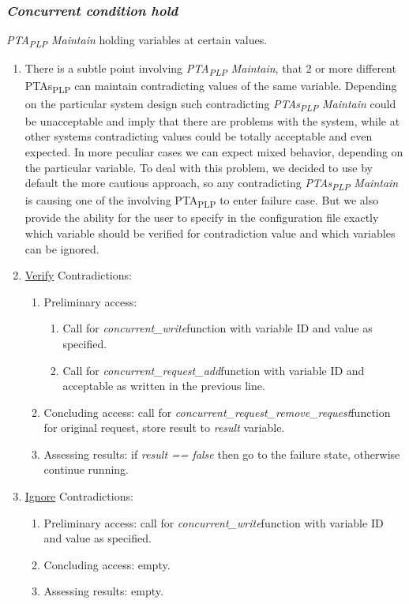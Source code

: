 \subsubsection{\textit{\textit{Concurrent condition} hold} \label{memory_module_applications_concurrent_condition_hold}}
\textit{PTA\textsubscript{PLP} Maintain} holding variables at certain values.
\begin{enumerate}  
\item There is a subtle point involving \textit{PTA\textsubscript{PLP} Maintain}, that 2 or more different PTAs\textsubscript{PLP} can maintain contradicting values of the same variable. Depending on the particular system design such contradicting \textit{PTAs\textsubscript{PLP} Maintain} could be unacceptable and imply that there are problems with the system, while at other systems contradicting values could be totally acceptable and even expected. In more peculiar cases we can expect mixed behavior, depending on the particular variable. To deal with this problem, we decided to use by default the more cautious approach, so any contradicting \textit{PTAs\textsubscript{PLP} Maintain} is causing one of the involving PTA\textsubscript{PLP} to enter failure case. But we also provide the ability for the user to specify in the configuration file exactly which variable should be verified for contradiction value and which variables can be ignored.  
\item \underline{Verify} Contradictions:
\begin{enumerate} 
\item Preliminary access:
\begin{enumerate}  
\item Call for \textcolor{ColorUppaalFunction}{\textit{concurrent_write}}​ function with variable ID and value as specified.  
\item Call for \textcolor{ColorUppaalFunction}{\textit{concurrent_request_add}}​ function with variable ID and acceptable as written in the previous line.
\end{enumerate}  
\item Concluding access: call for \textcolor{ColorUppaalFunction}{\textit{concurrent_request_remove_request}}​ function for original request, store result to \textcolor{ColorEdgeGuard}{\textit{result}} variable.  
\item Assessing results: if \textcolor{ColorEdgeGuard}{\textit{result == false}} then go to the failure state, otherwise continue running.
\end{enumerate}  
\item \underline{Ignore} Contradictions:
\begin{enumerate}  
\item Preliminary access: call for \textcolor{ColorUppaalFunction}{\textit{concurrent_write}}​ function with variable ID and value as specified. 
\item Concluding access: empty. 
\item Assessing results: empty.
\end{enumerate}
\end{enumerate}
